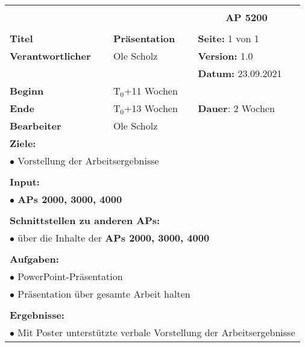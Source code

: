 \clearpage
\begin{table}[!h]
	\begin{center}
		\begin{tabular}{|p{35mm}||p{55mm}|p{50mm}||p{40mm}|}
			\hline
			\multicolumn{3}{|l||}{\textbf{}} & \multicolumn{1}{c|}{}\\
			\multicolumn{3}{|l||}{\textbf{}} & \multicolumn{1}{c|}{\textbf{AP 5200}}\\
			\multicolumn{3}{|l||}{\textbf{}} & \multicolumn{1}{c|}{}\\
			\hline\hline
			\textbf{Titel} & \multicolumn{2}{p{7cm}||}{\textbf{Präsentation}} 
			& \textbf{Seite:} 1 von 1\\
			\hline
			\textbf{Verantwortlicher} & \multicolumn{2}{l||}{Ole Scholz} & \textbf{Version:} 1.0\\
			\hline
			\multicolumn{3}{|l||}{} & \textbf{Datum:} 23.09.2021\\
			\hline\hline
			\textbf{Beginn} & \multicolumn{2}{l||}{T$_0$+11 Wochen} & \\
			\hline
			\textbf{Ende} & \multicolumn{2}{l||}{T$_0$+13 Wochen} & \textbf{Dauer}: 2 Wochen\\
			\hline\hline
			\textbf{Bearbeiter} & \multicolumn{3}{l|}{Ole Scholz}\\
			\hline\hline
			\multicolumn{4}{|p{150mm}|}{\textbf{Ziele:}}\\
			\multicolumn{4}{|p{150mm}|}{$\bullet$ Vorstellung der Arbeitsergebnisse}\\
			\multicolumn{4}{|p{150mm}|}{}\\
			\multicolumn{4}{|p{150mm}|}{\textbf{Input:}}\\
			\multicolumn{4}{|p{150mm}|}{$\bullet$ \textbf{APs 2000, 3000, 4000}}\\
			\multicolumn{4}{|p{150mm}|}{}\\
			\multicolumn{4}{|p{150mm}|}{\textbf{Schnittstellen zu anderen APs:}}\\
			\multicolumn{4}{|p{150mm}|}{$\bullet$ über die Inhalte der \textbf{APs 2000, 3000, 4000}}\\
			\multicolumn{4}{|p{150mm}|}{}\\
			\multicolumn{4}{|p{150mm}|}{\textbf{Aufgaben:}}\\
			\multicolumn{4}{|p{150mm}|}{$\bullet$ PowerPoint-Präsentation}\\
			\multicolumn{4}{|p{150mm}|}{$\bullet$ Präsentation über gesamte Arbeit halten}\\
			\multicolumn{4}{|p{150mm}|}{}\\
			\multicolumn{4}{|p{150mm}|}{\textbf{Ergebnisse:}}\\
			\multicolumn{4}{|p{150mm}|}{$\bullet$ Mit Poster unterstützte verbale Vorstellung der Arbeitsergebnisse}\\
			\hline
		\end{tabular}
	\end{center}
\end{table}